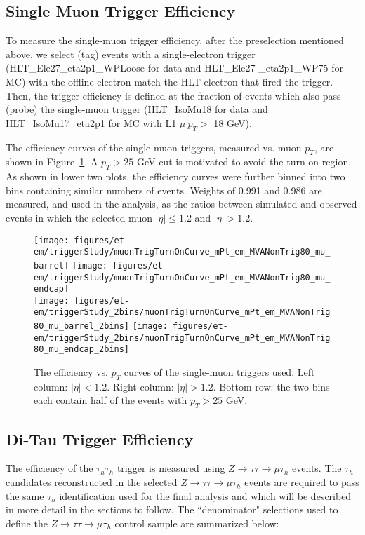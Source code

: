 \subsection{Single Muon Trigger Efficiency}\label{sec:muTrigger}
To measure the single-muon trigger efficiency, after the preselection
mentioned above, we select (tag) events with a single-electron trigger
 (HLT\_Ele27\_eta2p1\_WPLoose for data and HLT\_Ele27 \_eta2p1\_WP75 for MC) 
with the offline electron match the HLT electron that fired the trigger.
Then, the trigger efficiency is defined at the fraction of events
which also pass (probe) the single-muon trigger 
(HLT\_IsoMu18 for data and HLT\_IsoMu17\_eta2p1 for MC with L1 $\mu~p_T > $ 18 GeV).

The efficiency curves of the single-muon triggers, measured vs. muon
$p_{T}$, are shown in Figure~\ref{fig:muturnon}. A $p_{T} > 25$ GeV cut is
motivated to avoid the turn-on region. As shown in lower two plots,
the efficiency curves were further binned into two bins containing
similar numbers of events.  Weights of 0.991 and 0.986 are measured,
and used in the analysis, as the ratios between simulated and observed
events in which the selected muon $|\eta| \leq 1.2$ and $|\eta|>1.2$.
\begin{figure}\centering
  \texttt{[image: figures/et-em/triggerStudy/muonTrigTurnOnCurve\_mPt\_em\_MVANonTrig80\_mu\_barrel]}
  \texttt{[image: figures/et-em/triggerStudy/muonTrigTurnOnCurve\_mPt\_em\_MVANonTrig80\_mu\_endcap]} \\
  \texttt{[image: figures/et-em/triggerStudy\_2bins/muonTrigTurnOnCurve\_mPt\_em\_MVANonTrig80\_mu\_barrel\_2bins]}
  \texttt{[image: figures/et-em/triggerStudy\_2bins/muonTrigTurnOnCurve\_mPt\_em\_MVANonTrig80\_mu\_endcap\_2bins]} \\
  \caption{\label{fig:muturnon} The efficiency vs. $p_{T}$ curves of the
    single-muon triggers used.  Left column: $|\eta|<1.2$.  Right
    column: $|\eta|>1.2$.  Bottom row: the two bins each contain half
    of the events with $p_{T} > 25$ GeV.}
\end{figure}

\subsection{Di-Tau Trigger Efficiency}\label{sec:tauTrigger}

The efficiency of the $\tau_{h}\tau_{h}$ trigger is measured using 
$Z\to\tau\tau\to\mu\tau_{h}$ events.  The $\tau_{h}$ candidates 
reconstructed in the selected $Z\to\tau\tau\to\mu\tau_{h}$ events are 
required to pass the same $\tau_{h}$ identification used for the final
analysis and which will be described in more detail in the sections to follow. The 
``denominator" selections used to define the $Z\to\tau\tau\to\mu\tau_{h}$ control sample 
are summarized below:

